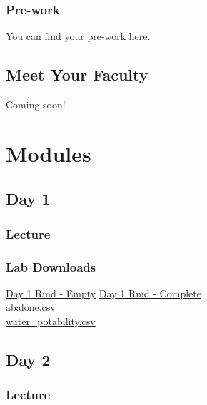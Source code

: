 \documentclass[
]{book}
\begin{document}
\section{Pre-work}\label{pre-work}

\href{https://docs.google.com/forms/d/e/1FAIpQLSeAV5gz7dADoF7JQCih9yOF7GP0IwOIxDK1ClG3jxB9yiJaQA/viewform?usp=dialog}{You can find your pre-work here.}

\chapter{Meet Your Faculty}\label{meet-your-faculty}

Coming soon!

\part{Modules}\label{part-modules}

\chapter{Day 1}\label{day-1}

\section{Lecture}\label{lecture}

\section{Lab Downloads}\label{lab-downloads}

\href{https://drive.google.com/file/d/1yfOvH9V7Bfv10zSSZn7YVtd-onhiR1zl/view?usp=sharing}{Day 1 Rmd - Empty} \textbar{} \href{https://drive.google.com/file/d/1HQqMnK00K3UyRp-6qZPtyXygra8d6iIO/view?usp=sharing}{Day 1 Rmd - Complete}\\
\href{https://drive.google.com/file/d/1taCATRfEQxTA0sUqw1dBgX9812DUSMZq/view?usp=drive_link}{abalone.csv}\\
\href{https://drive.google.com/file/d/1ZOTY43EyPoNBltGedDfOdsKzq9HSA77e/view?usp=sharing}{water\_potability.csv}

\chapter{Day 2}\label{day-2}

\section{Lecture}\label{lecture-1}
\end{document}
